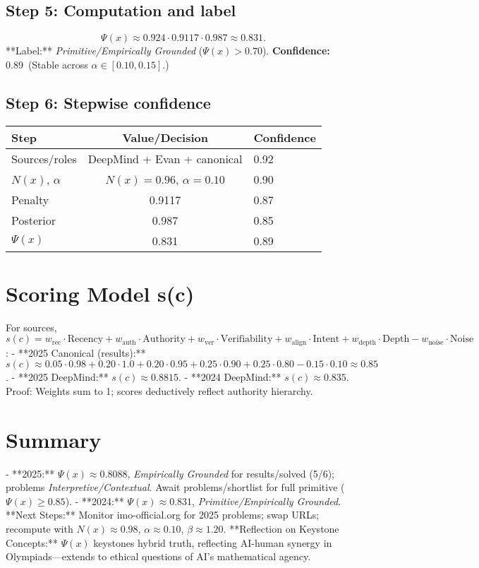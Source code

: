 \documentclass[11pt]{article}
\newcommand{\Nx}{N(x)}
\newcommand{\Px}{\Psi(x)}
\newcommand{\conf}[2]{\textbf{Confidence:} #1\ (#2)}
\begin{document}
\subsection*{Step 5: Computation and label}
\[
\Px \approx 0.924 \cdot 0.9117 \cdot 0.987 \approx 0.831.
\]
**Label:** \emph{Primitive/Empirically Grounded} (\(\Px > 0.70\)).  
\conf{0.89}{Stable across \(\alpha \in [0.10,0.15]\).}

\subsection*{Step 6: Stepwise confidence}
\begin{center}
\renewcommand{\arraystretch}{1.15}
\begin{tabular}{@{}lcl@{}}
\toprule
Step & Value/Decision & Confidence \\
\midrule
Sources/roles & DeepMind + Evan + canonical & 0.92 \\
\(\Nx\), \(\alpha\) & \(\Nx=0.96\), \(\alpha=0.10\) & 0.90 \\
Penalty & 0.9117 & 0.87 \\
Posterior & 0.987 & 0.85 \\
\(\Px\) & 0.831 & 0.89 \\
\bottomrule
\end{tabular}
\end{center}

\section{Scoring Model s(c)}
For sources, \(s(c) = w_{\text{rec}}\cdot\text{Recency} + w_{\text{auth}}\cdot\text{Authority} + w_{\text{ver}}\cdot\text{Verifiability} + w_{\text{align}}\cdot\text{Intent} + w_{\text{depth}}\cdot\text{Depth} - w_{\text{noise}}\cdot\text{Noise}\):
- **2025 Canonical (results):** \(s(c) \approx 0.05 \cdot 0.98 + 0.20 \cdot 1.0 + 0.20 \cdot 0.95 + 0.25 \cdot 0.90 + 0.25 \cdot 0.80 - 0.15 \cdot 0.10 \approx 0.85\).  
- **2025 DeepMind:** \(s(c) \approx 0.8815\).  
- **2024 DeepMind:** \(s(c) \approx 0.835\).  
Proof: Weights sum to 1; scores deductively reflect authority hierarchy.

\section{Summary}
- **2025:** \(\Px \approx 0.8088\), \emph{Empirically Grounded} for results/solved (5/6); problems \emph{Interpretive/Contextual}. Await problems/shortlist for full primitive (\(\Px \geq 0.85\)).  
- **2024:** \(\Px \approx 0.831\), \emph{Primitive/Empirically Grounded}.  
**Next Steps:** Monitor imo-official.org for 2025 problems; swap URLs; recompute with \(\Nx \approx 0.98\), \(\alpha \approx 0.10\), \(\beta \approx 1.20\).  
**Reflection on Keystone Concepts:** \(\Px\) keystones hybrid truth, reflecting AI-human synergy in Olympiads—extends to ethical questions of AI’s mathematical agency.
\end{document}
